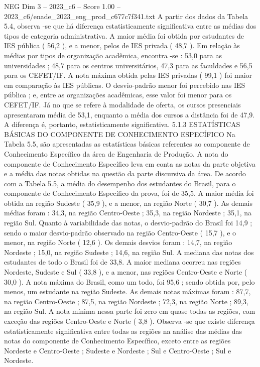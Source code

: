 \begin{textsample}{NEG Dim 3 – 2023\_c6 – Score 1.00 – 2023\_c6/enade\_2023\_eng\_prod\_c677c7f341.txt}
A partir dos dados da Tabela 5.4, observa -se que há diferença estatisticamente significativa entre as médias dos tipos de categoria administrativa.
A maior média foi obtida por estudantes de IES pública ( 56,2 ), e a menor, pelos de IES privada ( 48,7 ).
Em relação às médias por tipos de organização acadêmica, encontra -se : 53,0 para as universidades ; 48,7 para os centros universitários, 47,3 para as faculdades e 56,5 para os CEFET/IF.
A nota máxima obtida pelas IES privadas ( 99,1 ) foi maior em comparação às IES públicas.
O desvio-padrão menor foi percebido nas IES pública ; e, entre as organizações acadêmicas, esse valor foi menor para os CEFET/IF.
Já no que se refere à modalidade de oferta, os cursos presenciais apresentaram média de 53,1, enquanto a média dos cursos a distância foi de 47,9.
A diferença é, portanto, estatisticamente significativa. 5.1.3 ESTATÍSTICAS BÁSICAS DO COMPONENTE DE CONHECIMENTO ESPECÍFICO Na Tabela 5.5, são apresentadas as estatísticas básicas referentes ao componente de Conhecimento Específico da área de Engenharia de Produção.
A nota do componente de Conhecimento Específico leva em conta as notas da parte objetiva e a média das notas obtidas na questão da parte discursiva da área.
De acordo com a Tabela 5.5, a média do desempenho dos estudantes do Brasil, para o componente de Conhecimento Específico da prova, foi de 35,5.
A maior média foi obtida na região Sudeste ( 35,9 ), e a menor, na região Norte ( 30,7 ).
As demais médias foram : 34,3, na região Centro-Oeste ; 35,3, na região Nordeste ; 35,1, na região Sul.
Quanto à variabilidade das notas, o desvio-padrão do Brasil foi 14,9 ; sendo o maior desvio-padrão observado na região Centro-Oeste ( 15,7 ), e o menor, na região Norte ( 12,6 ).
Os demais desvios foram : 14,7, na região Nordeste ; 15,0, na região Sudeste ; 14,6, na região Sul.
A mediana das notas dos estudantes de todo o Brasil foi de 33,8.
A maior mediana ocorreu nas regiões Nordeste, Sudeste e Sul ( 33,8 ), e a menor, nas regiões Centro-Oeste e Norte ( 30,0 ).
A nota máxima do Brasil, como um todo, foi 95,6 ; sendo obtida por, pelo menos, um estudante na região Sudeste.
As demais notas máximas foram : 87,7, na região Centro-Oeste ; 87,5, na região Nordeste ; 72,3, na região Norte ; 89,3, na região Sul.
A nota mínima nessa parte foi zero em quase todas as regiões, com exceção das regiões Centro-Oeste e Norte ( 3,8 ).
Observa -se que existe diferença estatisticamente significativa entre todas as regiões na análise das médias das notas do componente de Conhecimento Específico, exceto entre as regiões Nordeste e Centro-Oeste ; Sudeste e Nordeste ; Sul e Centro-Oeste ; Sul e Nordeste.

\end{textsample}
